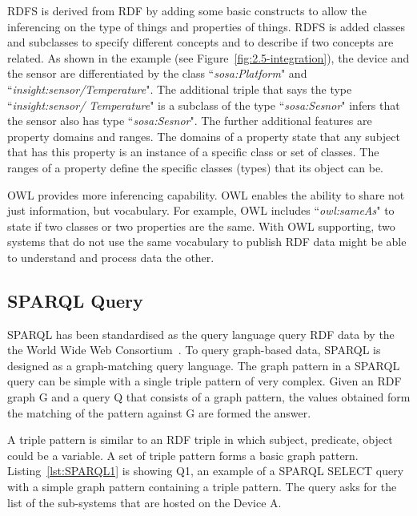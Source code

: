 {RDFS is derived from RDF by adding some basic constructs to allow the inferencing on the type of things and properties of things.
RDFS is added classes and subclasses to specify different concepts and to describe if two concepts are related.
As shown in the example (see Figure~\ref{fig:2.5-integration}), the device and the sensor are differentiated by the class ``\textit{sosa:Platform}" and ``\textit{insight:sensor/Temperature}". 
The additional triple that says the type ``\textit{insight:sensor/ Temperature}" is a subclass of the type ``\textit{sosa:Sesnor}" infers that the sensor also has type ``\textit{sosa:Sesnor}".
The further additional features are property domains and ranges.
The domains of a property state that any subject that has this property is an instance of a specific class or set of classes.
The ranges of a property define the specific classes (types) that its object can be.

OWL provides more inferencing capability. 
OWL enables the ability to share not just information, but vocabulary.
For example, OWL includes ``\textit{owl:sameAs}" to state if two classes or two properties are the same.
With OWL supporting, two systems that do not use the same vocabulary to publish RDF data might be able to understand and process data the other. 

\subsection{SPARQL Query}
\label{ss:sparql}

SPARQL has been standardised as the query language query RDF data by the the World Wide Web Consortium~\citep{Eric:2008}.
To query graph-based data, SPARQL is designed as a graph-matching query language.
The graph pattern in a SPARQL query can be simple with a single triple pattern of very complex.
Given an RDF graph G and a query Q that consists of a graph pattern, the values obtained form the matching of the pattern against G are formed the answer.

A triple pattern is similar to an RDF triple in which subject, predicate, object could be a variable.
A set of triple pattern forms a basic graph pattern. 
Listing~\ref{lst:SPARQL1} is showing Q1, an example of a SPARQL SELECT query with a simple graph pattern containing a triple pattern.
The query asks for the list of the sub-systems that are hosted on the Device A.

}
